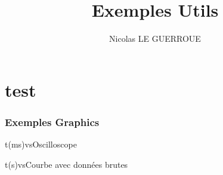 \documentclass[12pt]{report}
\begin{document}
\title{Exemples Utils}
\author{Nicolas LE GUERROUE}
\maketitle
\tableofcontents
\newpage


\part{test}

\section{Exemples Graphics}


\begin{exemple}
\begin{graphics}{0.8}{0.6}{0}{2.1}{-1.1}{1.1}{t(ms)}{vs}{Oscilloscope}
\end{graphics}
\end{exemple}


\begin{exemple}
\begin{graphics}{0.8}{0.4}{0}{40}{-1}{6}{t(s)}{vs}{Courbe avec données brutes}
\end{graphics}
\end{exemple}
\end{document}

